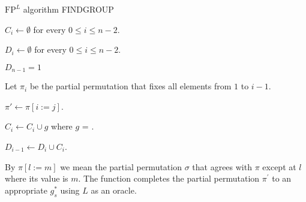\documentclass[11pt]{madras}%
\theoremstyle{remark}
\begin{document}
\begin{algorithm}[H]
   
   \caption{$\mathrm{FP}^L$ algorithm {\small
       FINDGROUP}}\label{alg-findgroup}

   $C_i \leftarrow \emptyset$ for every $0 \leq i \leq n-2$.

   $D_i \leftarrow \emptyset$ for every $0 \leq i \leq n-2$.

   $D_{n-1}=1$
       
   {     
     
     Let $\pi_i$ be the partial permutation that fixes all elements
     from $1$ to $i-1$.
     
     {
       
       $\pi' \leftarrow \pi[i := j]$.
       
       {       
       
         $C_i \leftarrow C_i \cup g$ where $g$ =
         .
       }
     }

     $D_{i-1} \leftarrow D_i \cup C_i$.

   }


   \Function{} 

\end{algorithm}

By $\pi[l:=m]$ we mean the partial permutation $\sigma$ that agrees
with $\pi$ except at $l$ where its value is $m$.  The function
 completes the partial permutation
$\pi^\prime$ to an appropriate $g_s^*$ using $L$ as an oracle.
\end{document}
